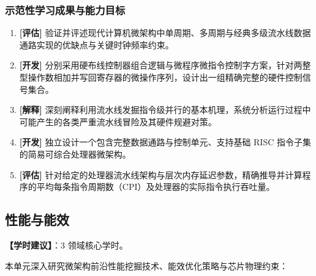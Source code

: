 \subsubsection{示范性学习成果与能力目标}
\begin{enumerate}
    \item \textbf{[评估]} 验证并评述现代计算机微架构中单周期、多周期与经典多级流水线数据通路实现的优缺点与关键时钟频率约束。
    \item \textbf{[开发]} 分别采用硬布线控制器组合逻辑与微程序微指令控制字方案，针对两整型操作数相加并写回寄存器的微操作序列，设计出一组精确完整的硬件控制信号集合。
    \item \textbf{[解释]} 深刻阐释利用流水线发掘指令级并行的基本机理，系统分析运行过程中可能产生的各类严重流水线冒险及其硬件规避对策。
    \item \textbf{[开发]} 独立设计一个包含完整数据通路与控制单元、支持基础 RISC 指令子集的简易可综合处理器微架构。
    \item \textbf{[评估]} 针对给定的处理器流水线架构与层次内存延迟参数，精确推导并计算程序的平均每条指令周期数（CPI）及处理器的实际指令执行吞吐量。
\end{enumerate}

\subsection{性能与能效}
\textbf{【学时建议】}：3 领域核心学时。

本单元深入研究微架构前沿性能挖掘技术、能效优化策略与芯片物理约束：

